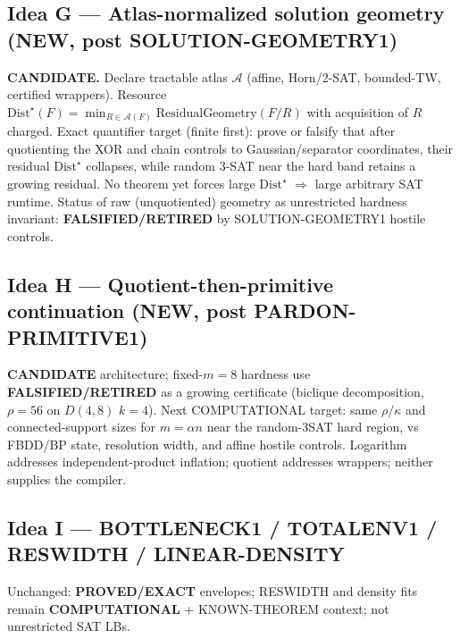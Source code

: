 \documentclass[11pt]{article}
\begin{document}
\subsection*{Idea G --- Atlas-normalized solution geometry (NEW, post SOLUTION-GEOMETRY1)}
\textbf{CANDIDATE.} Declare tractable atlas $\mathcal A$ (affine, Horn/2-SAT, bounded-TW,
certified wrappers). Resource
$\mathrm{Dist}^\star(F)=\min_{R\in\mathcal A(F)}\mathrm{ResidualGeometry}(F/R)$
with acquisition of $R$ charged. Exact quantifier target (finite first):
prove or falsify that after quotienting the XOR and chain controls to Gaussian/separator
coordinates, their residual $\mathrm{Dist}^\star$ collapses, while random 3-SAT near the
hard band retains a growing residual. No theorem yet forces large $\mathrm{Dist}^\star$
$\Rightarrow$ large arbitrary SAT runtime. Status of raw (unquotiented) geometry as
unrestricted hardness invariant: \textbf{FALSIFIED/RETIRED} by SOLUTION-GEOMETRY1
hostile controls.

\subsection*{Idea H --- Quotient-then-primitive continuation (NEW, post PARDON-PRIMITIVE1)}
\textbf{CANDIDATE} architecture; fixed-$m=8$ hardness use \textbf{FALSIFIED/RETIRED}
as a growing certificate (biclique decomposition, $\rho=56$ on $D(4,8)$ $k=4$).
Next COMPUTATIONAL target: same $\rho/\kappa$ and connected-support sizes for
$m=\alpha n$ near the random-3SAT hard region, vs FBDD/BP state, resolution width,
and affine hostile controls. Logarithm addresses independent-product inflation;
quotient addresses wrappers; neither supplies the compiler.

\subsection*{Idea I --- BOTTLENECK1 / TOTALENV1 / RESWIDTH / LINEAR-DENSITY}
Unchanged: \textbf{PROVED/EXACT} envelopes; RESWIDTH and density fits remain
\textbf{COMPUTATIONAL} + KNOWN-THEOREM context; not unrestricted SAT LBs.
\end{document}
